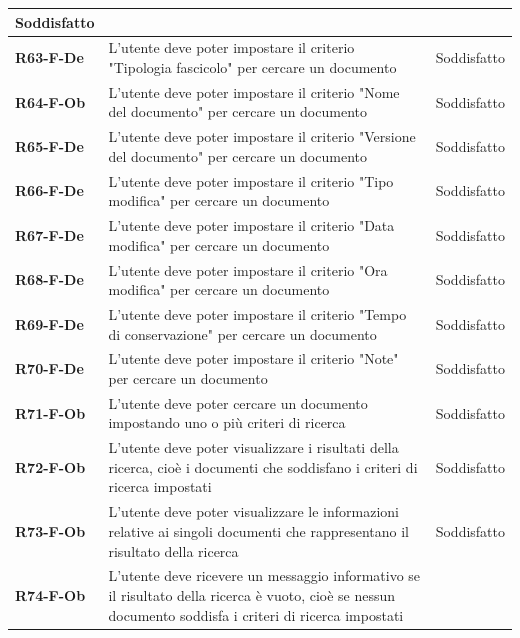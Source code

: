 \documentclass[a4paper,12pt]{article}
\begin{document}
{{\begin{longtable}{|>{\centering\arraybackslash}m{}|>{\centering\arraybackslash}m{}|>{\centering\arraybackslash}m{}|}
                Soddisfatto \\ 
                \hline
                \textbf{R63-F-De} & L'utente deve poter impostare il criterio "Tipologia fascicolo" per cercare un documento & 
                Soddisfatto \\ 
                \hline
                \textbf{R64-F-Ob} & L'utente deve poter impostare il criterio "Nome del documento" per cercare un documento & 
                Soddisfatto \\ 
                \hline
                \textbf{R65-F-De} & L'utente deve poter impostare il criterio "Versione del documento" per cercare un documento & 
                Soddisfatto \\ 
                \hline
                \textbf{R66-F-De} & L'utente deve poter impostare il criterio "Tipo modifica" per cercare un documento & 
                Soddisfatto \\ 
                \hline
                \textbf{R67-F-De} & L'utente deve poter impostare il criterio "Data modifica" per cercare un documento & 
                Soddisfatto \\ 
                \hline
                \textbf{R68-F-De} & L'utente deve poter impostare il criterio "Ora modifica" per cercare un documento & 
                Soddisfatto \\ 
                \hline
                \textbf{R69-F-De} & L'utente deve poter impostare il criterio "Tempo di conservazione" per cercare un documento & 
                Soddisfatto \\ 
                \hline
                \textbf{R70-F-De} & L'utente deve poter impostare il criterio "Note" per cercare un documento & 
                Soddisfatto \\ 
                \hline
                \textbf{R71-F-Ob} & L'utente deve poter cercare un documento impostando uno o più criteri di ricerca & 
                Soddisfatto \\ 
                \hline
                \textbf{R72-F-Ob} & L'utente deve poter visualizzare i risultati della ricerca, cioè i documenti che soddisfano i criteri di ricerca impostati & 
                Soddisfatto \\ 
                \hline
                \textbf{R73-F-Ob} & L'utente deve poter visualizzare le informazioni relative ai singoli documenti che rappresentano il risultato della ricerca & 
                Soddisfatto \\ 
                \hline
                \textbf{R74-F-Ob} & L'utente deve ricevere un messaggio informativo se il risultato della ricerca è vuoto, cioè se nessun documento soddisfa i criteri di ricerca impostati & 

\end{longtable}}}
\end{document}

